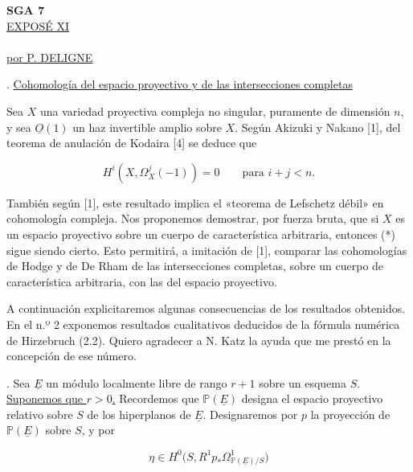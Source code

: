 
\clearpage
\pageoriginale

\begin{center}
{\large\textbf{SGA 7}}\\[1.5em]
{\Large\underline{EXPOSÉ XI}}\\[2.5em]
\\[1.5em]
{\large\underline{por P. DELIGNE}}
\end{center}

\bigskip
{}. \underline{Cohomología del espacio proyectivo y de las
intersecciones completas}

Sea $X$ una variedad proyectiva compleja no singular, puramente de dimensión
$n$, y sea $\underline O(1)$ un haz invertible amplio sobre $X$. Según
Akizuki y Nakano [1], del teorema de anulación de Kodaira [4] se deduce que

\begin{equation}\tag{*}
H^i(X,\Omega_X^j(-1))=0\qquad\text{para }i+j<n.
\end{equation}

También según [1], este resultado implica el «teorema de Lefschetz débil»
en cohomología compleja. Nos proponemos demostrar, por fuerza bruta, que si
$X$ es un espacio proyectivo sobre un cuerpo de característica arbitraria,
entonces (*) sigue siendo cierto. Esto permitirá, a imitación de [1],
comparar las cohomologías de Hodge y de De Rham de las intersecciones
completas, sobre un cuerpo de característica arbitraria, con las del espacio
proyectivo.

A continuación explicitaremos algunas consecuencias de los resultados
obtenidos. En el n.º 2 exponemos resultados cualitativos deducidos de la
fórmula numérica de Hirzebruch (2.2). Quiero agradecer a N. Katz la ayuda que
me prestó en la concepción de ese número.

\medskip
{}. Sea $\underline E$ un módulo localmente libre de rango $r+1$
sobre un esquema $S$. \underline{Suponemos que $r>0$.} Recordemos que
$\mathbb P(\underline E)$ designa el espacio proyectivo relativo sobre $S$
de los hiperplanos de $\underline E$. Designaremos por $p$ la proyección de
$\mathbb P(\underline E)$ sobre $S$, y por

\begin{equation*}
\eta\in H^0\bigl(S,R^1p_*\Omega^1_{\mathbb P(\underline E)/S}\bigr)
\end{equation*}

